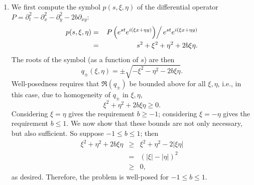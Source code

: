 \documentclass{article}
\begin{document}
\begin{enumerate}
\begin{enumerate}
\item We first compute the symbol \(p(s,\xi,\eta)\) of the differential operator \(P = \partial_t^2 - \partial_x^2 - \partial_y^2 - 2 b \partial_{xy}\):
\begin{eqnarray*}
p(s,\xi,\eta)
& = & \left. P \left( e^{st} e^{i(\xi x + \eta y)} \right) \right/ e^{st} e^{i(\xi x + \eta y)} \\
& = & s^2 + \xi^2 + \eta^2 + 2 b \xi \eta.
\end{eqnarray*}
The roots of the symbol (as a function of \(s\)) are then
\[q_{\pm}(\xi,\eta) = \pm \sqrt{-\xi^2 - \eta^2 - 2b \xi \eta}.\]
Well-posedness requires that \(\Re \left( q_{\pm} \right)\) be bounded above for all \(\xi,\eta\), i.e., in this case, due to homogeneity of \(q_{\pm}\) in \(\xi,\eta\),
\[\xi^2 + \eta^2 + 2b \xi \eta \geq 0.\]
Considering \(\xi = \eta\) gives the requirement \(b \geq -1\); considering \(\xi = -\eta\) gives the requirement \(b \leq 1\).  We now show that these bounds are not only necessary, but also sufficient.  So suppose \(-1 \leq b \leq 1\); then
\begin{eqnarray*}
\xi^2 + \eta^2 + 2b \xi \eta
& \geq & \xi^2 + \eta^2 - 2 |\xi \eta| \\
&   =  & \left( |\xi| - |\eta| \right)^2 \\
& \geq & 0,
\end{eqnarray*}
as desired.  Therefore, the problem is well-posed for \(-1 \leq b \leq 1\).


\end{enumerate}
\end{enumerate}
\end{document}

